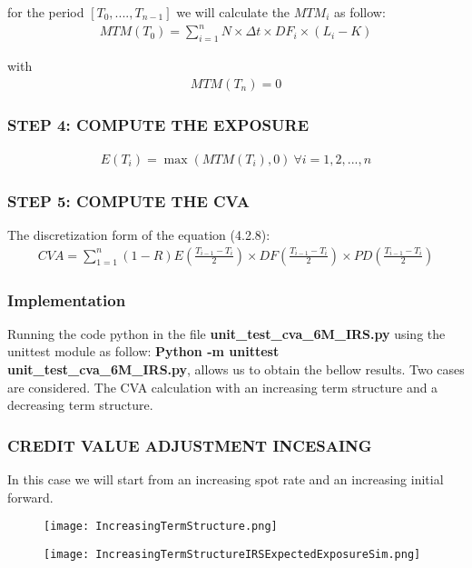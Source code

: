 \documentclass[11pt]{article}
\numberwithin{equation}{subsection}
\begin{document}
\noindent for the period \([T_0,...., T_{n-1}]\) we will calculate the \(MTM_i\) as follow:
\begin{eqnarray*}
	MTM(T_0) = \sum_{i=1}^{n} N \times \Delta t \times DF_i \times (L_i - K) 
\end{eqnarray*}

\noindent with 
\begin{eqnarray*}
	MTM(T_n) = 0
\end{eqnarray*}

\subsubsection{STEP 4: COMPUTE THE EXPOSURE}
\begin{eqnarray*}
	E(T_i) = \max(MTM(T_i), 0) \ \forall i = 1,2,...,n
\end{eqnarray*}

\subsubsection{STEP 5: COMPUTE THE CVA}
The discretization form of the equation (4.2.8):
\begin{eqnarray*}
	CVA = \sum_{1=1}^{n} (1-R) E(\frac{T_{i-1}-T_i}{2}) \times DF(\frac{T_{i-1}-T_i}{2})  \times PD(\frac{T_{i-1}-T_i}{2})
\end{eqnarray*}
\subsubsection{Implementation}
Running the code python in the file \textbf{unit\_test\_cva\_6M\_IRS.py} using the unittest module as follow:
\textbf{Python -m unittest unit\_test\_cva\_6M\_IRS.py}, allows us to obtain the bellow results. Two cases are considered. The CVA calculation with an increasing term structure and a decreasing term structure.
\subsubsection{CREDIT VALUE ADJUSTMENT INCESAING}
In this case we will start from an increasing spot rate and an increasing initial forward. 

\begin{figure}[H]
	\texttt{[image: IncreasingTermStructure.png]}
\end{figure}


\begin{figure}[H]
	\texttt{[image: IncreasingTermStructureIRSExpectedExposureSim.png]}	
\end{figure}
\end{document}
